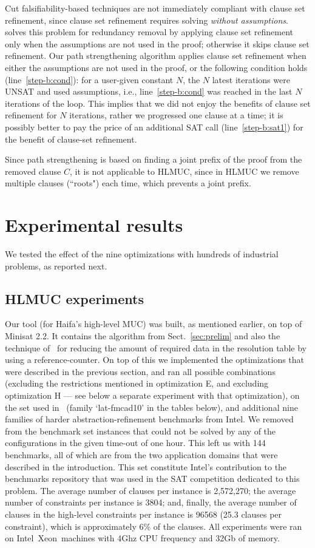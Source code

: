 \documentclass[twoside,11pt]{article}
\newcommand\muser{\tool{MUSer2}\xspace}
\begin{document}
Cut falsifiability-based techniques are not immediately compliant with clause
set refinement, since clause set refinement requires solving \emph{without
assumptions}.
\muser solves this problem for redundancy removal by applying clause set
refinement only when the assumptions are not used in the proof; otherwise it
skips clause set refinement. Our path strengthening algorithm applies clause
set refinement when either the assumptions are not used in the proof, or the following condition holds (line~\ref{step-b:cond}): for a user-given constant $N$, the $N$ latest iterations
were UNSAT and used assumptions, i.e., line~\ref{step-b:cond} was reached in the last $N$ iterations of the loop. This implies that we did not enjoy the benefits of clause set refinement for $N$ iterations, rather we progressed one clause at a time; it is possibly better to pay the price of an additional SAT call (line~\ref{step-b:sat1}) for the benefit of clause-set refinement.

Since path strengthening is based on finding a joint prefix of the proof from
the removed clause $C$, it is not applicable to HLMUC, since in HLMUC we remove
multiple clauses (``roots") each time, which prevents a joint prefix.


\section{Experimental results}
We tested the effect of the nine optimizations with hundreds of industrial problems, as reported next.


\subsection{HLMUC experiments}
\label{sec:experiments} Our tool  (for Haifa's high-level MUC)
was built, as mentioned earlier, on top of Minisat 2.2. It contains the
algorithm from Sect.~\ref{sec:prelim} and also the technique of~\cite{SY07}
for reducing the amount of required data in the resolution table by using a
reference-counter. 
On top of this we implemented the optimizations that were
described in the previous section, and ran all possible combinations
(excluding the restrictions mentioned in optimization E, and excluding optimization H --- see below a separate experiment with that optimization), on the set used in~\cite{N10} (family `lat-fmcad10' in the tables below), and additional nine families of harder abstraction-refinement benchmarks from Intel.
We removed from the benchmark set instances that could not be solved by any of
the configurations in the given time-out of one hour. This left us with 144
benchmarks, all of which are from the two application domains that were
described in the introduction. This set constitute Intel's contribution to
the benchmarks repository that was used in the SAT competition
dedicated to this problem. The average number of clauses per instance is
2,572,270; the average number of constraints per instance is 3804; and,
finally, the average number of clauses in the high-level constraints per instance is 96568
(25.3 clauses per constraint), which is approximately 6\% of the clauses. All
experiments were ran on Intel\textregistered\ Xeon\textregistered\ machines
with 4Ghz CPU frequency and 32Gb of memory.
\end{document}
